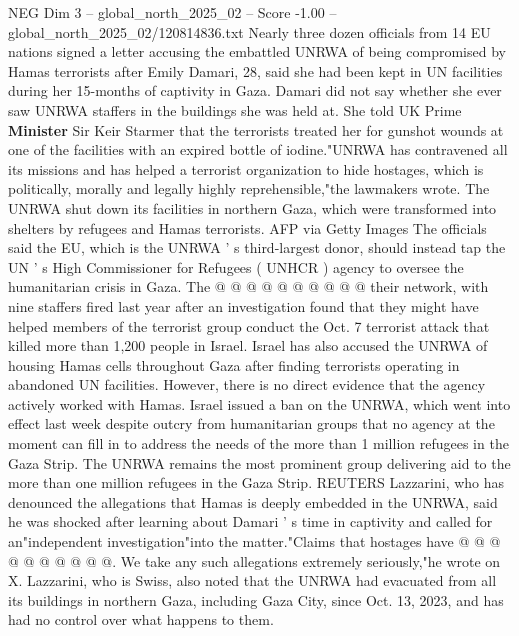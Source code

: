 \begin{textsample}{NEG Dim 3 – global\_north\_2025\_02 – Score -1.00 – global\_north\_2025\_02/120814836.txt}  \label{ex:f3_neg_163}
Nearly three dozen officials from 14 EU nations signed a letter accusing the embattled UNRWA of being compromised by Hamas terrorists after Emily Damari, 28, said she had been kept in UN facilities during her 15-months of captivity in Gaza.
Damari did not say whether she ever saw UNRWA staffers in the buildings she was held at.
She told UK Prime \textbf{Minister} Sir Keir Starmer that the terrorists treated her for gunshot wounds at one of the facilities with an expired bottle of iodine."UNRWA has contravened all its missions and has helped a terrorist organization to hide hostages, which is politically, morally and legally highly reprehensible,"the lawmakers wrote.
The UNRWA shut down its facilities in northern Gaza, which were transformed into shelters by refugees and Hamas terrorists.
AFP via Getty Images The officials said the EU, which is the UNRWA ' s third-largest donor, should instead tap the UN ' s High Commissioner for Refugees ( UNHCR ) agency to oversee the humanitarian crisis in Gaza.
The @ @ @ @ @ @ @ @ @ @ their network, with nine staffers fired last year after an investigation found that they might have helped members of the terrorist group conduct the Oct. 7 terrorist attack that killed more than 1,200 people in Israel.
Israel has also accused the UNRWA of housing Hamas cells throughout Gaza after finding terrorists operating in abandoned UN facilities.
However, there is no direct evidence that the agency actively worked with Hamas.
Israel issued a ban on the UNRWA, which went into effect last week despite outcry from humanitarian groups that no agency at the moment can fill in to address the needs of the more than 1 million refugees in the Gaza Strip.
The UNRWA remains the most prominent group delivering aid to the more than one million refugees in the Gaza Strip.
REUTERS Lazzarini, who has denounced the allegations that Hamas is deeply embedded in the UNRWA, said he was shocked after learning about Damari ' s time in captivity and called for an"independent investigation"into the matter."Claims that hostages have @ @ @ @ @ @ @ @ @ @.
We take any such allegations extremely seriously,"he wrote on X.
Lazzarini, who is Swiss, also noted that the UNRWA had evacuated from all its buildings in northern Gaza, including Gaza City, since Oct. 13, 2023, and has had no control over what happens to them.

\end{textsample}
